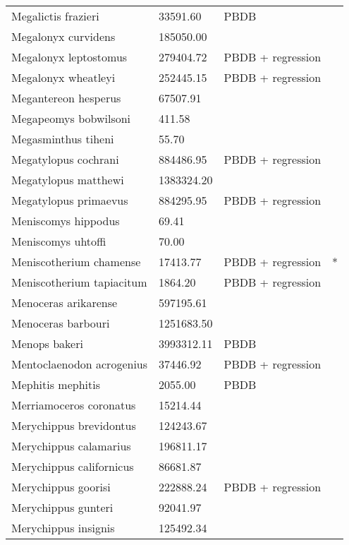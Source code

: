\documentclass{article}
\begin{document}
\begin{center}
\begin{longtable}{p{} p{} p{} p{}}
    Megalictis frazieri & 33591.60 & PBDB &  \\ 
    Megalonyx curvidens & 185050.00 & \cite{McDonald2005} &  \\ 
    Megalonyx leptostomus & 279404.72 & PBDB + regression &  \\ 
    Megalonyx wheatleyi & 252445.15 & PBDB + regression &  \\ 
    Megantereon hesperus & 67507.91 & \cite{Tomiya2013} &  \\ 
    Megapeomys bobwilsoni & 411.58 & \cite{Tomiya2013} &  \\ 
    Megasminthus tiheni & 55.70 & \cite{Tomiya2013} &  \\ 
    Megatylopus cochrani & 884486.95 & PBDB + regression &  \\ 
    Megatylopus matthewi & 1383324.20 & \cite{Tomiya2013} &  \\ 
    Megatylopus primaevus & 884295.95 & PBDB + regression &  \\ 
    Meniscomys hippodus & 69.41 & \cite{Tomiya2013} &  \\ 
    Meniscomys uhtoffi & 70.00 & \cite{McKenna2011} &  \\ 
    Meniscotherium chamense & 17413.77 & PBDB + regression & * \\ 
    Meniscotherium tapiacitum & 1864.20 & PBDB + regression &  \\ 
    Menoceras arikarense & 597195.61 & \cite{Tomiya2013} &  \\ 
    Menoceras barbouri & 1251683.50 & \cite{Tomiya2013} &  \\ 
    Menops bakeri & 3993312.11 & PBDB &  \\ 
    Mentoclaenodon acrogenius & 37446.92 & PBDB + regression &  \\ 
    Mephitis mephitis & 2055.00 & PBDB &  \\ 
    Merriamoceros coronatus & 15214.44 & \cite{Tomiya2013} &  \\ 
    Merychippus brevidontus & 124243.67 & \cite{Tomiya2013} &  \\ 
    Merychippus calamarius & 196811.17 & \cite{Tomiya2013} &  \\ 
    Merychippus californicus & 86681.87 & \cite{Tomiya2013} &  \\ 
    Merychippus goorisi & 222888.24 & PBDB + regression &  \\ 
    Merychippus gunteri & 92041.97 & \cite{Tomiya2013} &  \\ 
    Merychippus insignis & 125492.34 & \cite{Tomiya2013} &  \\ 

\end{longtable}
\end{center}
\end{document}
